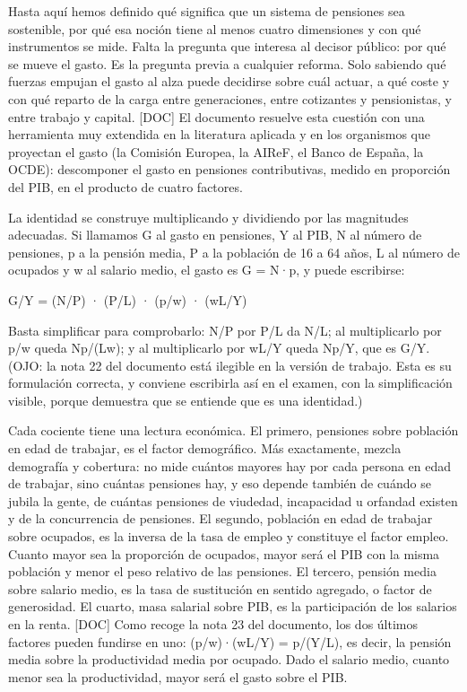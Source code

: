 \documentclass[10pt,a4paper]{article}
\begin{document}
Hasta aquí hemos definido qué significa que un sistema de pensiones sea sostenible, por qué esa noción tiene al menos cuatro dimensiones y con qué instrumentos se mide. Falta la pregunta que interesa al decisor público: por qué se mueve el gasto. Es la pregunta previa a cualquier reforma. Solo sabiendo qué fuerzas empujan el gasto al alza puede decidirse sobre cuál actuar, a qué coste y con qué reparto de la carga entre generaciones, entre cotizantes y pensionistas, y entre trabajo y capital. [DOC] El documento resuelve esta cuestión con una herramienta muy extendida en la literatura aplicada y en los organismos que proyectan el gasto (la Comisión Europea, la AIReF, el Banco de España, la OCDE): descomponer el gasto en pensiones contributivas, medido en proporción del PIB, en el producto de cuatro factores.

La identidad se construye multiplicando y dividiendo por las magnitudes adecuadas. Si llamamos G al gasto en pensiones, Y al PIB, N al número de pensiones, p a la pensión media, P a la población de 16 a 64 años, L al número de ocupados y w al salario medio, el gasto es G = N·p, y puede escribirse:

G/Y = (N/P) · (P/L) · (p/w) · (wL/Y)

Basta simplificar para comprobarlo: N/P por P/L da N/L; al multiplicarlo por p/w queda Np/(Lw); y al multiplicarlo por wL/Y queda Np/Y, que es G/Y. (OJO: la nota 22 del documento está ilegible en la versión de trabajo. Esta es su formulación correcta, y conviene escribirla así en el examen, con la simplificación visible, porque demuestra que se entiende que es una identidad.)

Cada cociente tiene una lectura económica. El primero, pensiones sobre población en edad de trabajar, es el factor demográfico. Más exactamente, mezcla demografía y cobertura: no mide cuántos mayores hay por cada persona en edad de trabajar, sino cuántas pensiones hay, y eso depende también de cuándo se jubila la gente, de cuántas pensiones de viudedad, incapacidad u orfandad existen y de la concurrencia de pensiones. El segundo, población en edad de trabajar sobre ocupados, es la inversa de la tasa de empleo y constituye el factor empleo. Cuanto mayor sea la proporción de ocupados, mayor será el PIB con la misma población y menor el peso relativo de las pensiones. El tercero, pensión media sobre salario medio, es la tasa de sustitución en sentido agregado, o factor de generosidad. El cuarto, masa salarial sobre PIB, es la participación de los salarios en la renta. [DOC] Como recoge la nota 23 del documento, los dos últimos factores pueden fundirse en uno: (p/w)·(wL/Y) = p/(Y/L), es decir, la pensión media sobre la productividad media por ocupado. Dado el salario medio, cuanto menor sea la productividad, mayor será el gasto sobre el PIB.
\end{document}
